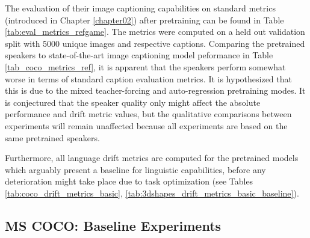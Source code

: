 The evaluation of their image captioning capabilities on standard metrics (introduced in Chapter \ref{chapter02}) after pretraining can be found in Table \ref{tab:eval_metrics_refgame}. The metrics were computed on a held out validation split with 5000 unique images and respective captions. Comparing the pretrained speakers to state-of-the-art image captioning model peformance in Table \ref{tab_coco_metrics_ref}, it is apparent that the speakers perform somewhat worse in terms of standard caption evaluation metrics. It is hypothesized that this is due to the mixed teacher-forcing and auto-regression pretraining modes. It is conjectured that the speaker quality only might affect the absolute performance and drift metric values, but the qualitative comparisons between experiments will remain unaffected because all experiments are based on the same pretrained speakers.

Furthermore, all language drift metrics are computed for the pretrained models which arguably present a baseline for linguistic capabilities, before any deterioration might take place due to task optimization (see Tables \ref{tab:coco_drift_metrics_basic}, \ref{tab:3dshapes_drift_metrics_basic_baseline}).

\subsection{MS COCO: Baseline Experiments}
\label{expt:coco_baseline}

